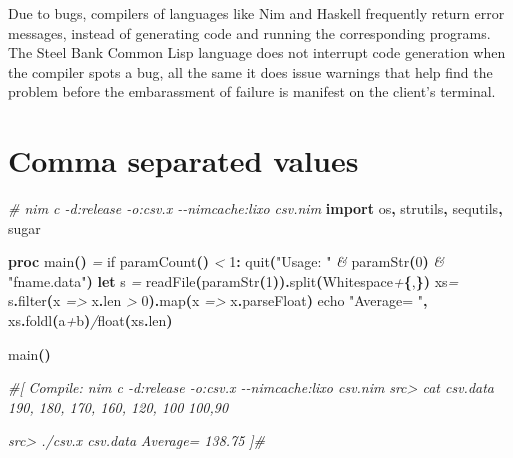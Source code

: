 \documentclass[
  12pt,
]{book}
\newenvironment{Shaded}{}{}
\newcommand{\CharTok}[1]{\textcolor[rgb]{0.25,0.44,0.63}{#1}}
\newcommand{\CommentTok}[1]{\textcolor[rgb]{0.38,0.63,0.69}{\textit{#1}}}
\newcommand{\DataTypeTok}[1]{\textcolor[rgb]{0.56,0.13,0.00}{#1}}
\newcommand{\DecValTok}[1]{\textcolor[rgb]{0.25,0.63,0.44}{#1}}
\newcommand{\KeywordTok}[1]{\textcolor[rgb]{0.00,0.44,0.13}{\textbf{#1}}}
\newcommand{\NormalTok}[1]{#1}
\newcommand{\StringTok}[1]{\textcolor[rgb]{0.25,0.44,0.63}{#1}}
\begin{document}
Due to bugs, compilers of languages like Nim and Haskell frequently
return error messages, instead of generating code and running the
corresponding programs. The Steel Bank Common Lisp language does not
interrupt code generation when the compiler spots a bug, all the same it
does issue warnings that help find the problem before the embarassment
of failure is manifest on the client's terminal.

\chapter{Comma separated values}\label{comma-separated-values}

\begin{Shaded}
\begin{Highlighting}[]
\CommentTok{\# nim c {-}d:release {-}o:csv.x {-}{-}nimcache:lixo csv.nim}
\KeywordTok{import}\NormalTok{ os}\KeywordTok{,}\NormalTok{ strutils}\KeywordTok{,}\NormalTok{ sequtils}\KeywordTok{,}\NormalTok{ sugar}

\KeywordTok{proc }\StringTok{main}\KeywordTok{()} \CommentTok{=}
  \DataTypeTok{if} \DataTypeTok{paramCount}\KeywordTok{()} \CommentTok{\textless{}} \DecValTok{1}\KeywordTok{:} \DataTypeTok{quit}\KeywordTok{(}\StringTok{"Usage: "} \CommentTok{\&} \DataTypeTok{paramStr}\KeywordTok{(}\DecValTok{0}\KeywordTok{)} \CommentTok{\&} \StringTok{"fname.data"}\KeywordTok{)}
  \KeywordTok{let}
\NormalTok{    s }\CommentTok{=} \DataTypeTok{readFile}\KeywordTok{(}\DataTypeTok{paramStr}\KeywordTok{(}\DecValTok{1}\KeywordTok{)).}\DataTypeTok{split}\KeywordTok{(}\DataTypeTok{Whitespace}\CommentTok{+}\KeywordTok{\{}\CharTok{\textquotesingle{},\textquotesingle{}}\KeywordTok{\})}
\NormalTok{    xs}\CommentTok{=}\NormalTok{ s}\KeywordTok{.}\DataTypeTok{filter}\KeywordTok{(}\NormalTok{x }\CommentTok{=\textgreater{}}\NormalTok{ x}\KeywordTok{.}\DataTypeTok{len} \CommentTok{\textgreater{}} \DecValTok{0}\KeywordTok{).}\DataTypeTok{map}\KeywordTok{(}\NormalTok{x }\CommentTok{=\textgreater{}}\NormalTok{ x}\KeywordTok{.}\DataTypeTok{parseFloat}\KeywordTok{)}
  \DataTypeTok{echo} \StringTok{"Average= "}\KeywordTok{,}\NormalTok{ xs}\KeywordTok{.}\DataTypeTok{foldl}\KeywordTok{(}\NormalTok{a}\CommentTok{+}\NormalTok{b}\KeywordTok{)}\CommentTok{/}\DataTypeTok{float}\KeywordTok{(}\NormalTok{xs}\KeywordTok{.}\DataTypeTok{len}\KeywordTok{)}

\DataTypeTok{main}\KeywordTok{()}

\CommentTok{\#[ }
\CommentTok{   Compile:  nim c {-}d:release {-}o:csv.x {-}{-}nimcache:lixo csv.nim}
\CommentTok{   src\textgreater{} cat csv.data}
\CommentTok{   190, 180, 170, 160, 120,  100}
\CommentTok{   100,90  }

\CommentTok{   src\textgreater{} ./csv.x csv.data}
\CommentTok{   Average= 138.75}
\CommentTok{]\#}
\end{Highlighting}
\end{Shaded}
\end{document}
